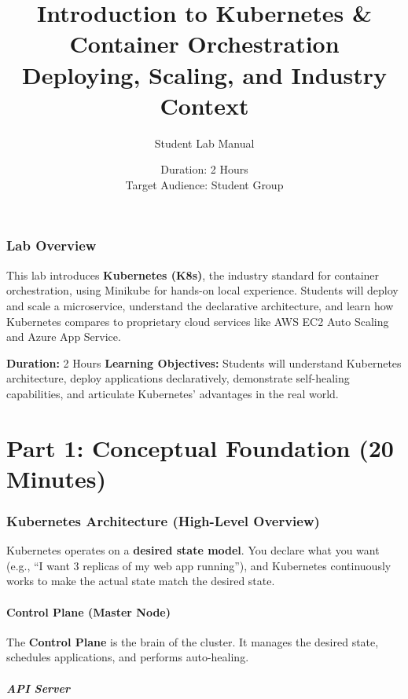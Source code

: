 \documentclass[12pt,a4paper]{article}
\title{\Huge Introduction to Kubernetes \& Container Orchestration \\
       \Large Deploying, Scaling, and Industry Context}
\author{Student Lab Manual}
\date{Duration: 2 Hours \\ Target Audience: Student Group}
\begin{document}
\maketitle

\newpage

\tableofcontents

\newpage

\section*{Lab Overview}

This lab introduces \textbf{Kubernetes (K8s)}, the industry standard for container orchestration, using Minikube for hands-on local experience. Students will deploy and scale a microservice, understand the declarative architecture, and learn how Kubernetes compares to proprietary cloud services like AWS EC2 Auto Scaling and Azure App Service.

\textbf{Duration:} 2 Hours \newline
\textbf{Learning Objectives:} Students will understand Kubernetes architecture, deploy applications declaratively, demonstrate self-healing capabilities, and articulate Kubernetes' advantages in the real world.

\newpage

\part{Part 1: Conceptual Foundation (20 Minutes)}

\section{Kubernetes Architecture (High-Level Overview)}

Kubernetes operates on a \textbf{desired state model}. You declare what you want (e.g., ``I want 3 replicas of my web app running''), and Kubernetes continuously works to make the actual state match the desired state.

\subsection{Control Plane (Master Node)}

The \textbf{Control Plane} is the brain of the cluster. It manages the desired state, schedules applications, and performs auto-healing.

\subsubsection{API Server}
\end{document}
